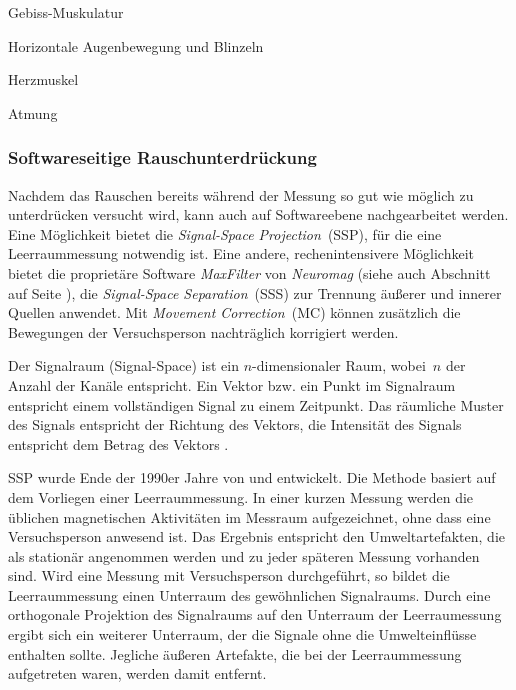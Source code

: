 \documentclass[doc,a4paper,12pt]{apa6}
\makeatletter
\DeclareRobustCommand*{\nameref}[1]{%
      \glqq{\myorg@nameref{#1}}\grqq%
    }%
\makeatother
\begin{document}
\begin{compactitem}
\item Gebiss-Muskulatur
\item Horizontale Augenbewegung und Blinzeln
\item Herzmuskel
\item Atmung
\end{compactitem}

\subsubsection{Softwareseitige Rauschunterdrückung}
\label{sec:maxfilter}

Nachdem das Rauschen bereits während der Messung so gut wie möglich zu unterdrücken versucht wird, kann auch auf Softwareebene nachgearbeitet werden. Eine Möglichkeit bietet die \emph{Signal-Space Projection}~(SSP), für die eine Leerraummessung notwendig ist. Eine andere, rechenintensivere Möglichkeit bietet die proprietäre Software \emph{MaxFilter} von \emph{Neuromag} (siehe auch Abschnitt \nameref{sec:software} auf Seite \pageref{sec:software}), die \emph{Signal-Space Separation}~(SSS) zur Trennung äußerer und innerer Quellen anwendet. Mit \emph{Movement Correction}~(MC) können zusätzlich die Bewegungen der Versuchsperson nachträglich korrigiert werden.

Der Signalraum (Signal-Space) ist ein $n$-dimensionaler Raum, wobei~$n$ der Anzahl der Kanäle entspricht. Ein Vektor bzw. ein Punkt im Signalraum entspricht einem vollständigen Signal zu einem Zeitpunkt. Das räumliche Muster des Signals entspricht der Richtung des Vektors, die Intensität des Signals entspricht dem Betrag des Vektors \parencite{hansen2010meg}.

SSP wurde Ende der 1990er Jahre von \textcite{uusitalo1997signal} und \textcite{parkkonen1999interference} entwickelt. Die Methode basiert auf dem Vorliegen einer Leerraummessung. In einer kurzen Messung werden die üblichen magnetischen Aktivitäten im Messraum aufgezeichnet, ohne dass eine Versuchsperson anwesend ist. Das Ergebnis entspricht den Umweltartefakten, die als stationär angenommen werden und zu jeder späteren Messung vorhanden sind. Wird eine Messung mit Versuchsperson durchgeführt, so bildet die Leerraummessung einen Unterraum des gewöhnlichen Signalraums. Durch eine orthogonale Projektion des Signalraums auf den Unterraum der Leerraumessung ergibt sich ein weiterer Unterraum, der die Signale ohne die Umwelteinflüsse enthalten sollte. Jegliche äußeren Artefakte, die bei der Leerraummessung aufgetreten waren, werden damit entfernt.
\end{document}
